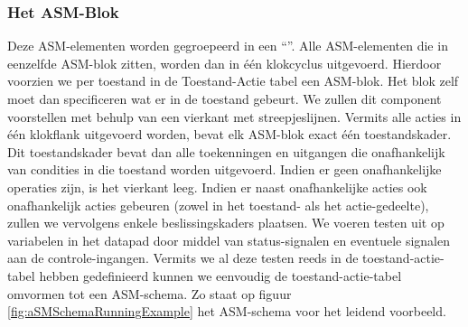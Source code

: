 \subsubsection{Het ASM-Blok}
Deze ASM-elementen worden gegroepeerd in een ``''. Alle ASM-elementen die in eenzelfde ASM-blok zitten, worden dan in \'e\'en klokcyclus uitgevoerd. Hierdoor voorzien we per toestand in de Toestand-Actie tabel een ASM-blok. Het blok zelf moet dan specificeren wat er in de toestand gebeurt. We zullen dit component voorstellen met behulp van een vierkant met streepjeslijnen. Vermits alle acties in \'e\'en klokflank uitgevoerd worden, bevat elk ASM-blok exact \'e\'en toestandskader. Dit toestandskader bevat dan alle toekenningen en uitgangen die onafhankelijk van condities in die toestand worden uitgevoerd. Indien er geen onafhankelijke operaties zijn, is het vierkant leeg. Indien er naast onafhankelijke acties ook onafhankelijk acties gebeuren (zowel in het toestand- als het actie-gedeelte), zullen we vervolgens enkele beslissingskaders plaatsen. We voeren testen uit op variabelen in het datapad door middel van status-signalen en eventuele signalen aan de controle-ingangen. Vermits we al deze testen reeds in de toestand-actie-tabel hebben gedefinieerd kunnen we eenvoudig de toestand-actie-tabel omvormen tot een ASM-schema. Zo staat op figuur \ref{fig:aSMSchemaRunningExample} het ASM-schema voor het leidend voorbeeld.
